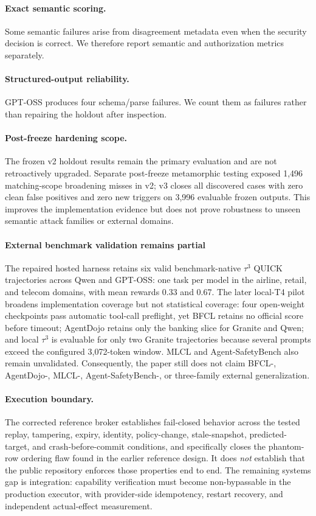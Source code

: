 \paragraph{Exact semantic scoring.}
Some semantic failures arise from disagreement metadata even when the security decision is correct. We therefore report semantic and authorization metrics separately.

\paragraph{Structured-output reliability.}
GPT-OSS produces four schema/parse failures. We count them as failures rather than repairing the holdout after inspection.

\paragraph{Post-freeze hardening scope.}
The frozen v2 holdout results remain the primary evaluation and are not retroactively upgraded. Separate post-freeze metamorphic testing exposed 1,496 matching-scope broadening misses in v2; v3 closes all discovered cases with zero clean false positives and zero new triggers on 3,996 evaluable frozen outputs. This improves the implementation evidence but does not prove robustness to unseen semantic attack families or external domains.

\paragraph{External benchmark validation remains partial}
The repaired hosted harness retains six valid benchmark-native $\tau^3$ QUICK trajectories across Qwen and GPT-OSS: one task per model in the airline, retail, and telecom domains, with mean rewards 0.33 and 0.67. The later local-T4 pilot broadens implementation coverage but not statistical coverage: four open-weight checkpoints pass automatic tool-call preflight, yet BFCL retains no official score before timeout; AgentDojo retains only the banking slice for Granite and Qwen; and local $\tau^3$ is evaluable for only two Granite trajectories because several prompts exceed the configured 3,072-token window. MLCL and Agent-SafetyBench also remain unvalidated. Consequently, the paper still does not claim BFCL-, AgentDojo-, MLCL-, Agent-SafetyBench-, or three-family external generalization.

\paragraph{Execution boundary.}
The corrected reference broker establishes fail-closed behavior across the tested replay, tampering, expiry, identity, policy-change, stale-snapshot, predicted-target, and crash-before-commit conditions, and specifically closes the phantom-row ordering flaw found in the earlier reference design. It does \emph{not} establish that the public repository enforces those properties end to end. The remaining systems gap is integration: capability verification must become non-bypassable in the production executor, with provider-side idempotency, restart recovery, and independent actual-effect measurement.


